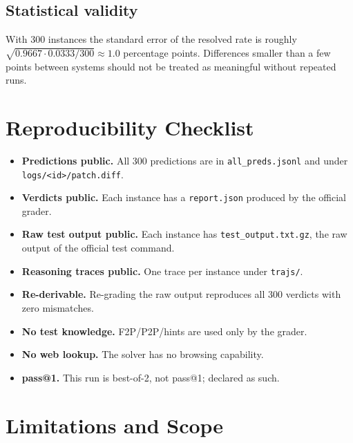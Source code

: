\documentclass[11pt,a4paper]{article}
\begin{document}
\subsection{Statistical validity}

With 300 instances the standard error of the resolved rate is roughly
$\sqrt{0.9667 \cdot 0.0333 / 300} \approx 1.0$ percentage points. Differences smaller than a
few points between systems should not be treated as meaningful without repeated runs.

\section{Reproducibility Checklist}
\label{sec:repro-checklist}

\begin{itemize}[leftmargin=1.4em]
  \item[\checkmark] \textbf{Predictions public.} All 300 predictions are in
  \texttt{all\_preds.jsonl} and under \texttt{logs/<id>/patch.diff}.
  \item[\checkmark] \textbf{Verdicts public.} Each instance has a \texttt{report.json}
  produced by the official grader.
  \item[\checkmark] \textbf{Raw test output public.} Each instance has
  \texttt{test\_output.txt.gz}, the raw output of the official test command.
  \item[\checkmark] \textbf{Reasoning traces public.} One trace per instance under
  \texttt{trajs/}.
  \item[\checkmark] \textbf{Re-derivable.} Re-grading the raw output reproduces all 300
  verdicts with zero mismatches.
  \item[\checkmark] \textbf{No test knowledge.} F2P/P2P/hints are used only by the grader.
  \item[\checkmark] \textbf{No web lookup.} The solver has no browsing capability.
  \item[\texttimes] \textbf{pass@1.} This run is best-of-2, not pass@1; declared as such.
\end{itemize}

\section{Limitations and Scope}
\label{sec:limitations}
\end{document}
